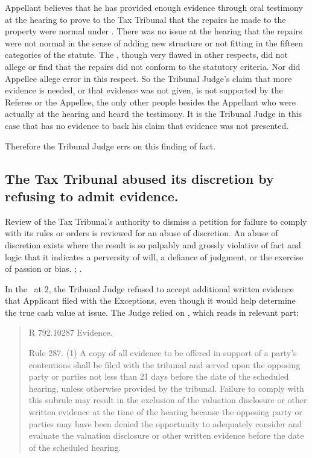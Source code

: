 \documentclass[12pt,\documentclassflag]{michiganCourtOfAppealsBrief}
\def\mathieuGast{\pincite[l]{MCL}{211.27(2)}}
\def\ttr287{\pincite[s]{TTR}{287}}
\begin{document}
{Appellant believes that he has provided enough evidence through oral testimony at the hearing to prove to the Tax Tribunal that the repairs he made to the property were normal under \mathieuGast. There was no issue at the hearing that the repairs were not normal in the sense of adding new structure or not fitting in the fifteen categories of the statute. The \POJ, though very flawed in other respects, did not allege or find that the repairs did not conform to the statutory criteria. Nor did Appellee allege error in this respect. So the Tribunal Judge's claim that more evidence is needed, or that evidence was not given, is not supported by the Referee or the Appellee, the only other people besides the Appellant who were actually at the hearing and heard the testimony. It is the Tribunal Judge in this case that has no evidence to back his claim that evidence was not presented.

Therefore the Tribunal Judge errs on this finding of fact.

\subsection{The Tax Tribunal abused its discretion by refusing to admit evidence.}
Review of the Tax Tribunal's authority to dismiss a petition for failure to comply with its rules or orders is reviewed for an abuse of discretion.  An abuse of discretion exists where the result is so palpably and grossly violative of fact and logic that it indicates a perversity of will, a defiance of judgment, or the exercise of passion or bias. ; .

In the \FOJ\ at 2, the Tribunal Judge refused to accept additional written evidence that Applicant filed with the Exceptions, even though it would help determine the true cash value at issue. The Judge relied on \ttr287, which reads in relevant part: 

\begin{quote}
  R 792.10287 Evidence. 
  
  Rule 287. (1) A copy of all evidence to be offered in support of a party's contentions shall be filed with the tribunal and served upon the opposing party or parties not less than 21 days before the date of the scheduled hearing, unless otherwise provided by the tribunal. Failure to comply with this subrule may result in the exclusion of the valuation disclosure or other written evidence at the time of the hearing because the opposing party or parties may have been denied the opportunity to adequately consider and evaluate the valuation disclosure or other written evidence before the date of the scheduled hearing. 
\end{quote}

}
\end{document}
